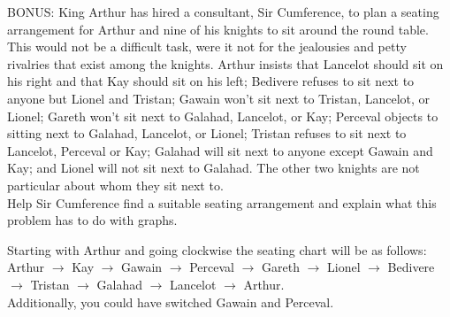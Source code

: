 \documentclass[10pt]{exam}
\begin{document}
\begin{questions}

\bonusquestion[4] BONUS: King Arthur has hired a consultant, Sir Cumference, to plan a seating arrangement for Arthur and nine of his knights to sit around the round table. This would not be a difficult task, were it not for the jealousies and petty rivalries that exist among the knights. Arthur insists that Lancelot should sit on his right and that Kay should sit on his left; Bedivere refuses to sit next to anyone but Lionel and Tristan; Gawain won't sit next to Tristan, Lancelot, or Lionel; Gareth won't sit next to Galahad, Lancelot, or Kay; Perceval objects to sitting next to Galahad, Lancelot, or Lionel; Tristan refuses to sit next to Lancelot, Perceval or Kay; Galahad will sit next to anyone except Gawain and Kay; and Lionel will not sit next to Galahad. The other two knights are not particular about whom they sit next to. \\
Help Sir Cumference find a suitable seating arrangement and explain what this problem has to do with graphs.
\begin{solution}
Starting with Arthur and going clockwise the seating chart will be as follows: Arthur $\rightarrow$ Kay $\rightarrow$ Gawain $\rightarrow$ Perceval $\rightarrow$ Gareth $\rightarrow$ Lionel $\rightarrow$ Bedivere $\rightarrow$ Tristan $\rightarrow$ Galahad $\rightarrow$ Lancelot $\rightarrow$ Arthur.\\
Additionally, you could have switched Gawain and Perceval.
\end{solution}
\end{questions}
\end{document}
